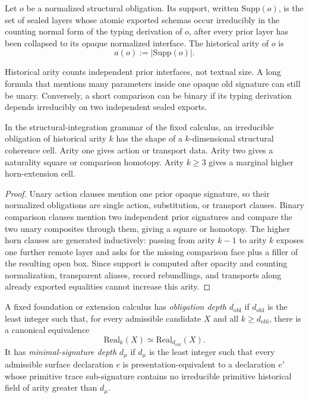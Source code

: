 \begin{definition}
\label{def:historical-arity}
Let \(o\) be a normalized structural obligation.  Its support, written \(\mathrm{Supp}(o)\),
is the set of sealed layers whose atomic exported schemas occur irreducibly in the counting
normal form of the typing derivation of \(o\), after every prior layer has been collapsed to
its opaque normalized interface.  The historical arity of \(o\) is
\[
  a(o) := |\mathrm{Supp}(o)|.
\]
\end{definition}

Historical arity counts independent prior interfaces, not textual size.  A long formula that
mentions many parameters inside one opaque old signature can still be unary.  Conversely, a
short comparison can be binary if its typing derivation depends irreducibly on two
independent sealed exports.

\begin{lemma}
\label{lem:arity-cell}
In the structural-integration grammar of the fixed calculus, an irreducible obligation of
historical arity \(k\) has the shape of a \(k\)-dimensional structural coherence cell.  Arity
one gives action or transport data.  Arity two gives a naturality square or comparison
homotopy.  Arity \(k\geq 3\) gives a marginal higher horn-extension cell.
\end{lemma}

\begin{proof}
Unary action clauses mention one prior opaque signature, so their normalized obligations are
single action, substitution, or transport clauses.  Binary comparison clauses mention two
independent prior signatures and compare the two unary composites through them, giving a
square or homotopy.  The higher horn clauses are generated inductively: passing from arity
\(k-1\) to arity \(k\) exposes one further remote layer and asks for the missing comparison
face plus a filler of the resulting open box.  Since support is computed after opacity and
counting normalization, transparent aliases, record rebundlings, and transports along already
exported equalities cannot increase this arity.
\end{proof}

\begin{definition}
\label{def:two-depths}
A fixed foundation or extension calculus has \emph{obligation depth} \(d_{\mathrm{obl}}\) if
\(d_{\mathrm{obl}}\) is the least integer such that, for every admissible candidate \(X\) and
all \(k\geq d_{\mathrm{obl}}\), there is a canonical equivalence
\[
  \mathrm{Real}_k(X) \simeq \mathrm{Real}_{d_{\mathrm{obl}}}(X).
\]
It has \emph{minimal-signature depth} \(d_\mu\) if \(d_\mu\) is the least integer such that
every admissible surface declaration \(e\) is presentation-equivalent to a declaration \(e'\)
whose primitive trace sub-signature contains no irreducible primitive historical field of
arity greater than \(d_\mu\).
\end{definition}


